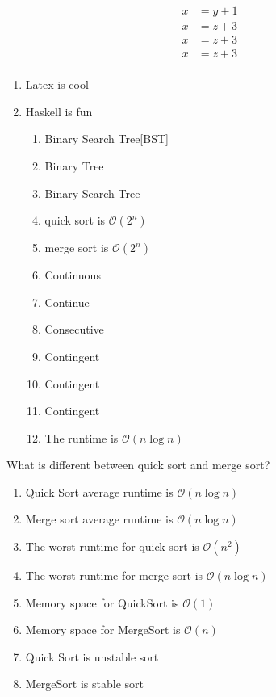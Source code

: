 \documentclass{article}
\begin{document}
\begin{equation}
\begin{aligned}
x & = y + 1 \\
x & = z + 3 \\
x & = z + 3 \\
x & = z + 3 \\
\end{aligned}
\end{equation} 

\begin{enumerate}
\item Latex is cool
\item Haskell is fun
\begin{enumerate}
\item Binary Search Tree[BST]
\item Binary Tree
\item Binary Search Tree
\item quick sort is $\mathcal{O}(2^n)$  
\item merge sort is $\mathcal{O}(2^n)$  
\item Continuous
\item Continue
\item Consecutive
\item Contingent
\item Contingent
\item Contingent
\item The runtime is $\mathcal{O}(n\log{}n)$ 
\end{enumerate}
\end{enumerate} 

\pagebreak
What is different between quick sort and merge sort? 
\begin{enumerate}
\item Quick Sort average runtime is $\mathcal{O}(n\log{}n)$  
\item Merge sort average runtime is $\mathcal{O}(n\log{}n)$  
\item The worst runtime for quick sort is $\mathcal{O}(n^2)$  
\item The worst runtime for merge sort is $\mathcal{O}(n\log{}n)$ 
\item Memory space for QuickSort is $\mathcal{O}(1)$ 
\item Memory space for MergeSort is $\mathcal{O}(n)$
\item Quick Sort is unstable sort
\item MergeSort is stable sort
\end{enumerate} 
\end{document}
